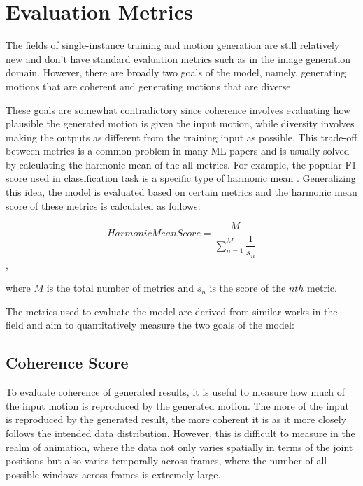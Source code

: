 \documentclass[a4paper, 12pt]{report}
\begin{document}
\section{Evaluation Metrics} \label{metrics}
The fields of single-instance training and motion generation are still relatively new and don't have standard evaluation metrics such as in the image generation domain. However, there are broadly two goals of the model, namely, generating motions that are coherent and generating motions that are diverse. 

These goals are somewhat contradictory since coherence involves evaluating how plausible the generated motion is given the input motion, while diversity involves making the outputs as different from the training input as possible. This trade-off between metrics is a common problem in many ML papers and is usually solved by calculating the harmonic mean of the all metrics. For example, the popular F1 score used in classification task is a specific type of harmonic mean \cite{hicks_evaluation_2022}. Generalizing this idea, the model is evaluated based on certain metrics and the harmonic mean score of these metrics is calculated as follows:

\begin{equation} \label{harmonic-mean}
	Harmonic Mean Score = \dfrac{M}{\sum_{n=1}^M \dfrac{1}{s_n}}
\end{equation},

where \(M\) is the total number of metrics and \(s_n\) is the score of the \(nth\) metric. 

The metrics used to evaluate the model are derived from similar works in the field \cite{li_ganimator_2022} and aim to quantitatively measure the two goals of the model:

\subsection{Coherence Score} \label{coherence}
To evaluate coherence of generated results, it is useful to measure how much of the input motion is reproduced by the generated motion. The more of the input is reproduced by the generated result, the more coherent it is as it more closely follows the intended data distribution. However, this is difficult to measure in the realm of animation, where the data not only varies spatially in terms of the joint positions but also varies temporally across frames, where the number of all possible windows across frames is extremely large. 
\end{document}
